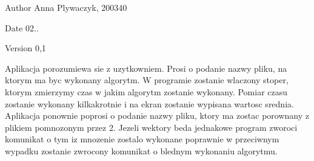 \begin{DoxyAuthor}{Author}
Anna Plywaczyk, 200340 
\end{DoxyAuthor}
\begin{DoxyDate}{Date}
02.. 
\end{DoxyDate}
\begin{DoxyVersion}{Version}
0,1
\end{DoxyVersion}
Aplikacja porozumiewa sie z uzytkowniem. Prosi o podanie nazwy pliku, na ktorym ma byc wykonany algorytm. W programie zostanie wlaczony stoper, ktorym zmierzymy czas w jakim algorytm zostanie wykonany. Pomiar czasu zostanie wykonany kilkakrotnie i na ekran zostanie wypisana wartosc srednia. Aplikacja ponownie poprosi o podanie nazwy pliku, ktory ma zostac porownany z plikiem pomnozonym przez 2. Jezeli wektory beda jednakowe program zworoci komunikat o tym iz mnozenie zostalo wykonane poprawnie w przeciwnym wypadku zostanie zwrocony komunikat o blednym wykonaniu algorytmu. 